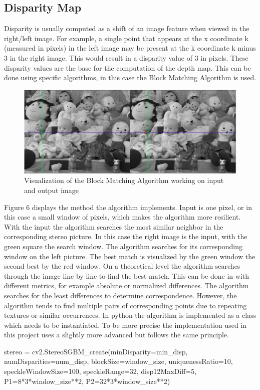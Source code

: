 \documentclass[journal,onecolumn]{IEEEtran}
\begin{document}
\subsection{Disparity Map}
\noindent
Disparity is usually computed as a shift of an image feature when viewed in the right/left image. For example, a single point that appears at the x coordinate k (measured in pixels) in the left image may be present at the k coordinate k minus 3 in the right image. This would result in a disparity value of 3 in pixels. These disparity values are the base for the computation of the depth map.
This can be done using specific algorithms, in this case the Block Matching Algorithm is used.
\begin{figure}[H]
	\centering
	\includegraphics[scale=0.5]{bma.png}
	\caption{Visualization of the Block Matching Algorithm working on input and output image}
\end{figure}
\noindent
Figure 6 displays the method the algorithm implements. Input is one pixel, or in this case a small window of pixels, which makes the algorithm more resilient. With the input the algorithm searches the most similar neighbor in the corresponding stereo picture. In this case the right image is the input, with the green square the search window. The algorithm searches for its corresponding window on the left picture. The best match is visualized by the green window the second best by the red window.
On a theoretical level the algorithm searches through the image line by line to find the best match.
This can be done in with different metrics, for example absolute or normalized differences. The algorithm searches for the least differences to determine correspondence. However, the algorithm tends to find multiple pairs of corresponding points due to repeating textures or similar occurrences.
In python the algorithm is implemented as a class which needs to be instantiated. To be more precise the implementation used in this project uses a slightly more advanced\cite{SGBM} but follows the same principle.
\begin{python}
stereo = cv2.StereoSGBM_create(minDisparity=min_disp,
			       numDisparities=num_disp,
			       blockSize=window_size,
			       uniquenessRatio=10,
			       speckleWindowSize=100,
			       speckleRange=32,
			       disp12MaxDiff=5,
			       P1=8*3*window_size**2,
			       P2=32*3*window_size**2)
\end{python}
\end{document}
